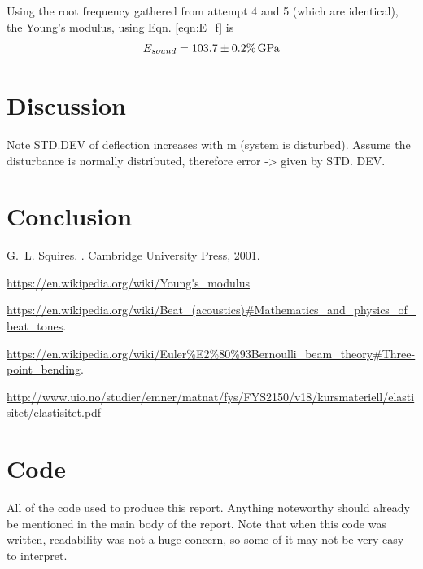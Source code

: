 \documentclass[11pt,a4paper]{article}
\begin{document}
    Using the root frequency gathered from attempt 4 and 5 (which are identical), the Young's modulus, using Eqn. \ref{eqn:E_f} is
    \begin{equation}
      E_{sound} = 103.7 \pm 0.2 \% \,\textup{G}\textup{Pa}
    \end{equation}


\newpage
\section{\label{sect:discussion}Discussion}

Note STD.DEV of deflection increases with m (system is disturbed). Assume the disturbance is normally distributed, therefore error -> given by STD. DEV.
 
\section{\label{sect:conclusion}Conclusion}




\begin{thebibliography}{1}

G.~L. Squires.
.
\newblock Cambridge University Press, 2001.

\url {https://en.wikipedia.org/wiki/Young's_modulus}

\url{https://en.wikipedia.org/wiki/Beat_(acoustics)#Mathematics_and_physics_of_beat_tones}.

\bibitem{3pt}
\url{https://en.wikipedia.org/wiki/Euler%E2%80%93Bernoulli_beam_theory#Three-point_bending}.

\url{http://www.uio.no/studier/emner/matnat/fys/FYS2150/v18/kursmateriell/elastisitet/elastisitet.pdf}


\end{thebibliography}

\appendix*
\section{Code}
All of the code used to produce this report. Anything noteworthy should already be mentioned in the main body of the report. Note that when this code was written, readability was not a huge concern, so some of it may not be very easy to interpret. 



\end{document}
